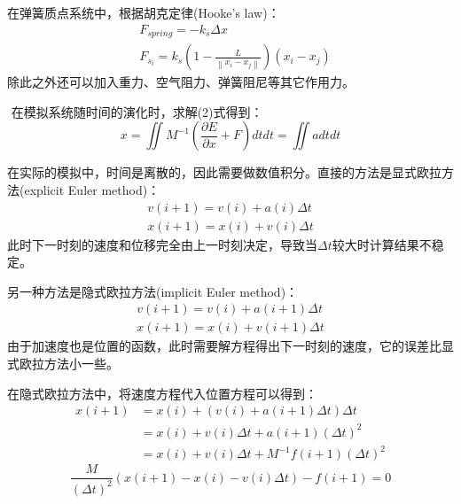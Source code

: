 \documentclass{CLGPY}
\begin{document}
\begin{multicols}{2}
		在弹簧质点系统中，根据胡克定律(Hooke's law)：
        \begin{equation}
		\begin{split}
			&F_{spring}=-k_s\Delta x \\
			&F_{s_i}=k_s(1-\frac{L}{\left \| x_i-x_j \right \| })(x_i-x_j)
		\end{split}
        \end{equation}
​		除此之外还可以加入重力、空气阻力、弹簧阻尼等其它作用力。

​		在模拟系统随时间的演化时，求解(2)式得到：
        \begin{equation}
            x = \iint M^{-1}(\frac{\partial E}{\partial x}+F)dtdt=\iint adtdt
        \end{equation}

		在实际的模拟中，时间是离散的，因此需要做数值积分。直接的方法是显式欧拉方法(explicit Euler method)：
        \begin{equation}
		\begin{split}
			v(i+1) = v(i) + a(i)\Delta t \\
			x(i+1) = x(i) + v(i)\Delta t
		\end{split}
        \end{equation}
		此时下一时刻的速度和位移完全由上一时刻决定，导致当$\Delta t$较大时计算结果不稳定。

		另一种方法是隐式欧拉方法(implicit Euler method)：
        \begin{equation}
		\begin{split}
			v(i+1) = v(i) + a(i+1)\Delta t \\
			x(i+1) = x(i) + v(i+1)\Delta t
		\end{split}
        \end{equation}
		由于加速度也是位置的函数，此时需要解方程得出下一时刻的速度，它的误差比显式欧拉方法小一些。

		在隐式欧拉方法中，将速度方程代入位置方程可以得到：
		\begin{equation}
		\begin{split}
			x(i+1) &= x(i) + (v(i) + a(i+1)\Delta t)\Delta t\\
       		&= x(i) + v(i)\Delta t + a(i+1)(\Delta t)^2\\
       		&= x(i) + v(i)\Delta t + M^{-1}f(i+1)(\Delta t)^2
		\end{split}
		\end{equation}
        \begin{equation}
			\frac{M}{(\Delta t)^2}(x(i+1)-x(i)-v(i)\Delta t) - f(i+1)=0
        \end{equation}


\end{multicols}
\end{document}
